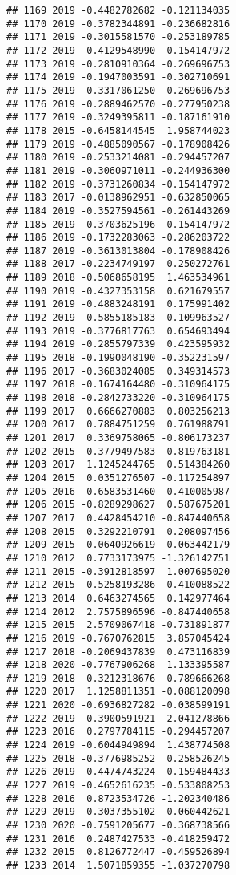 \documentclass[
]{article}
\begin{document}
\begin{verbatim}
## 1169 2019 -0.4482782682 -0.121134035
## 1170 2019 -0.3782344891 -0.236682816
## 1171 2019 -0.3015581570 -0.253189785
## 1172 2019 -0.4129548990 -0.154147972
## 1173 2019 -0.2810910364 -0.269696753
## 1174 2019 -0.1947003591 -0.302710691
## 1175 2019 -0.3317061250 -0.269696753
## 1176 2019 -0.2889462570 -0.277950238
## 1177 2019 -0.3249395811 -0.187161910
## 1178 2015 -0.6458144545  1.958744023
## 1179 2019 -0.4885090567 -0.178908426
## 1180 2019 -0.2533214081 -0.294457207
## 1181 2019 -0.3060971011 -0.244936300
## 1182 2019 -0.3731260834 -0.154147972
## 1183 2017 -0.0138962951 -0.632850065
## 1184 2019 -0.3527594561 -0.261443269
## 1185 2019 -0.3703625196 -0.154147972
## 1186 2019 -0.1732283063 -0.286203722
## 1187 2019 -0.3613013804 -0.178908426
## 1188 2017 -0.2234749197  0.250272761
## 1189 2018 -0.5068658195  1.463534961
## 1190 2019 -0.4327353158  0.621679557
## 1191 2019 -0.4883248191  0.175991402
## 1192 2019 -0.5855185183  0.109963527
## 1193 2019 -0.3776817763  0.654693494
## 1194 2019 -0.2855797339  0.423595932
## 1195 2018 -0.1990048190 -0.352231597
## 1196 2017 -0.3683024085  0.349314573
## 1197 2018 -0.1674164480 -0.310964175
## 1198 2018 -0.2842733220 -0.310964175
## 1199 2017  0.6666270883  0.803256213
## 1200 2017  0.7884751259  0.761988791
## 1201 2017  0.3369758065 -0.806173237
## 1202 2015 -0.3779497583  0.819763181
## 1203 2017  1.1245244765  0.514384260
## 1204 2015  0.0351276507 -0.117254897
## 1205 2016  0.6583531460 -0.410005987
## 1206 2015 -0.8289298627  0.587675201
## 1207 2017  0.4428454210 -0.847440658
## 1208 2015  0.3292210791  0.208097456
## 1209 2015 -0.0640926619 -0.063442179
## 1210 2012  0.7733173975 -1.326142751
## 1211 2015 -0.3912818597  1.007695020
## 1212 2015  0.5258193286 -0.410088522
## 1213 2014  0.6463274565  0.142977464
## 1214 2012  2.7575896596 -0.847440658
## 1215 2015  2.5709067418 -0.731891877
## 1216 2019 -0.7670762815  3.857045424
## 1217 2018 -0.2069437839  0.473116839
## 1218 2020 -0.7767906268  1.133395587
## 1219 2018  0.3212318676 -0.789666268
## 1220 2017  1.1258811351 -0.088120098
## 1221 2020 -0.6936827282 -0.038599191
## 1222 2019 -0.3900591921  2.041278866
## 1223 2016  0.2797784115 -0.294457207
## 1224 2019 -0.6044949894  1.438774508
## 1225 2018 -0.3776985252  0.258526245
## 1226 2019 -0.4474743224  0.159484433
## 1227 2019 -0.4652616235 -0.533808253
## 1228 2016  0.8723534726 -1.202340486
## 1229 2019 -0.3037355102  0.060442621
## 1230 2020 -0.7591205677 -0.368738566
## 1231 2016  0.2487427533 -0.418259472
## 1232 2015  0.8126772447 -0.459526894
## 1233 2014  1.5071859355 -1.037270798

\end{verbatim}
\end{document}
